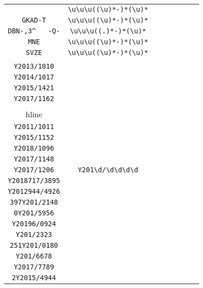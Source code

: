 \begin{longtable}{cccccccc}
\begin{tabular}{ll}
    \verb|GGQQY--F-A-K-T-T-JQB-| & \verb|\u\u\u((\u)*-)*(\u)*|\\
\verb|GKAD-T| & \verb|\u\u\u((\u)*-)*(\u)*|\\
\verb|DBN-,3^	-Q-| & \verb|\u\u\u((.)*-)*(\u)*|\\
\verb|MNE| & \verb|\u\u\u((\u)*-)*(\u)*|\\
\verb|SVZE| & \verb|\u\u\u((\u)*-)*(\u)*|
\end{tabular}
\\\midrule 
\begin{tabular}{l}
    \verb|Y2015/1093|\\
\verb|Y2013/1010|\\
\verb|Y2014/1017|\\
\verb|Y2015/1421|\\
\verb|Y2017/1162|\\
\\hline\\
\verb|Y2011/1011|\\
\verb|Y2015/1152|\\
\verb|Y2018/1096|\\
\verb|Y2017/1148|\\
\verb|Y2017/1206|
\end{tabular}

&
\verb|Y201\d/\d\d\d\d|
&

\begin{tabular}{l}
    \verb|(\d)*Y201(\d)*/\d\d\d\d|\\
\verb|Y2018717/3895|\\
\verb|Y2012944/4926|\\
\verb|397Y201/2148|\\
\verb|0Y201/5956|\\
\verb|Y20196/0924|
\end{tabular}

&

\begin{tabular}{l}
    \verb|(\d)*Y201(\d)*/\d\d\d\d|\\
\verb|Y201/2323|\\
\verb|251Y201/0180|\\
\verb|Y201/6678|\\
\verb|Y2017/7789|\\
\verb|2Y2015/4944|
\end{tabular}

&


\end{longtable}

